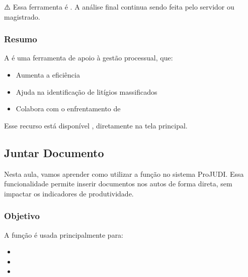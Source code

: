 \documentclass[letterpaper,10pt,brazil]{sphinxmanual}
\begin{document}
\sphinxAtStartPar
⚠️  Essa ferramenta é . A análise final continua sendo feita pelo servidor ou magistrado.


\subsubsection{Resumo}
\label{\detokenize{projud_14_iaarandu:resumo}}
\sphinxAtStartPar
A  é uma ferramenta de apoio à gestão processual, que:
\begin{itemize}
\item {} 
\sphinxAtStartPar
Aumenta a eficiência

\item {} 
\sphinxAtStartPar
Ajuda na identificação de litígios massificados

\item {} 
\sphinxAtStartPar
Colabora com o enfrentamento de 

\end{itemize}

\sphinxAtStartPar
Esse recurso está disponível , diretamente na tela principal.

\sphinxstepscope


\subsection{Juntar Documento}
\label{\detokenize{projud_15_juntardocumento:juntar-documento}}\label{\detokenize{projud_15_juntardocumento::doc}}
\sphinxAtStartPar
Nesta aula, vamos aprender como utilizar a função  no sistema ProJUDI. Essa funcionalidade permite inserir documentos nos autos de forma direta, sem impactar os indicadores de produtividade.


\subsubsection{Objetivo}
\label{\detokenize{projud_15_juntardocumento:objetivo}}
\sphinxAtStartPar
A função  é usada principalmente para:
\begin{itemize}
\item {} 
\sphinxAtStartPar
{}

\item {} 
\sphinxAtStartPar
{}

\item {} 
\sphinxAtStartPar
{}

\end{itemize}
\end{document}

